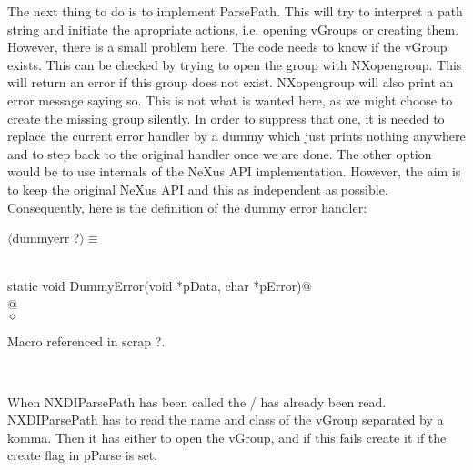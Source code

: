 \documentclass[12pt]{article}
\begin{document}
The next thing to do is to implement ParsePath. This will try to interpret a
path string and initiate the apropriate actions, i.e. opening vGroups or
creating them. However, there is a small problem here. The code needs to
know if the vGroup exists. This can be checked by trying to open the group
with NXopengroup. This will return an error if this group does not exist.
NXopengroup will also print an error message saying so. This is not what is
wanted here, as we might choose to create the missing group silently.
 In order to suppress
that one, it is needed to replace the current error handler by a dummy which
just prints nothing anywhere and to step back to the original handler once
we are done. The other option would be to use internals of the NeXus API
implementation. However, the aim is to keep the original NeXus API and this
as independent as possible.  Consequently, here is the definition of the
dummy error handler:
\begin{flushleft} \small
\begin{minipage}{\linewidth} \label{scrap20}
$\langle$dummyerr {\footnotesize ?}$\rangle\equiv$
\vspace{-1ex}
\begin{list}{}{} \item
\mbox{}\verb@@\\
\mbox{}\verb@   static void DummyError(void *pData, char *pError)@\\
\mbox{}@\\
\mbox{}\verb@@$\diamond$
\end{list}
\vspace{-1ex}
\footnotesize\addtolength{\baselineskip}{-1ex}
\begin{list}{}{\setlength{\itemsep}{-\parsep}\setlength{\itemindent}{-\leftmargin}}
\item Macro referenced in scrap ?.
\end{list}
\end{minipage}\\[4ex]
\end{flushleft}
When NXDIParsePath has been called the / has already been read.
NXDIParsePath has to read the name and class of the vGroup separated by a
komma. Then it has either to open the vGroup, and if this fails create it if
the create flag in pParse is set.
\end{document}
